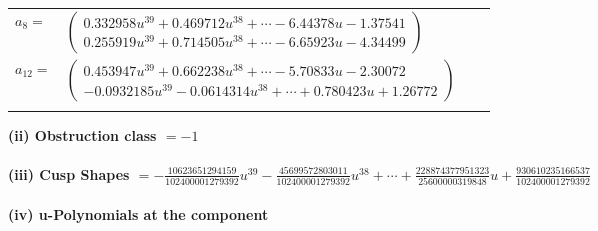 \documentclass[1p]{elsarticle_modified}
\theoremstyle{definition}
\begin{document}
\begin{tabular}{m{7pt} m{180pt} m{7pt} m{180pt} }
\flushright $a_{8}=$&$\begin{pmatrix}0.332958 u^{39}+0.469712 u^{38}+\cdots-6.44378 u-1.37541\\0.255919 u^{39}+0.714505 u^{38}+\cdots-6.65923 u-4.34499\end{pmatrix}$ \\
\flushright $a_{12}=$&$\begin{pmatrix}0.453947 u^{39}+0.662238 u^{38}+\cdots-5.70833 u-2.30072\\-0.0932185 u^{39}-0.0614314 u^{38}+\cdots+0.780423 u+1.26772\end{pmatrix}$\\&\end{tabular}
\flushleft \textbf{(ii) Obstruction class $= -1$}\\~\\
\flushleft \textbf{(iii) Cusp Shapes $= -\frac{10623651294159}{102400001279392} u^{39}-\frac{45699572803011}{102400001279392} u^{38}+\cdots+\frac{228874377951323}{25600000319848} u+\frac{930610235166537}{102400001279392}$}\\~\\
\newpage\renewcommand{\arraystretch}{1}
\flushleft \textbf{(iv) u-Polynomials at the component}\newline \\
\end{document}

